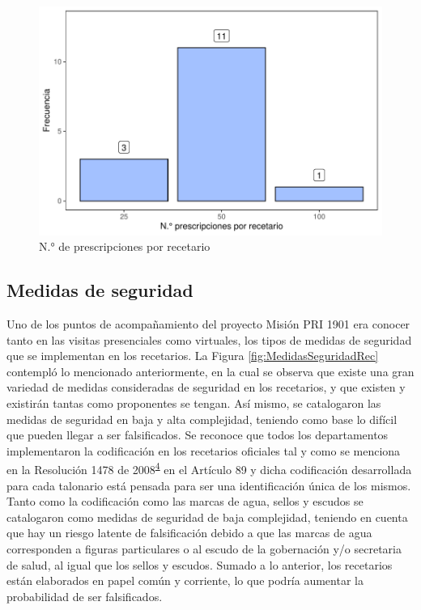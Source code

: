 \documentclass[
]{book}
\begin{document}
\begin{figure}

{\centering \includegraphics[width=0.85\linewidth]{InformeFinal_files/figure-latex/existenciaRecetarios4-1} 

}

\caption{N.° de prescripciones por recetario}\label{fig:existenciaRecetarios4}
\end{figure}

\hypertarget{medidas-de-seguridad}{%
\subsection{Medidas de seguridad}\label{medidas-de-seguridad}}

Uno de los puntos de acompañamiento del proyecto Misión PRI 1901 era conocer tanto en las visitas presenciales como virtuales, los tipos de medidas de seguridad que se implementan en los recetarios. La Figura \ref{fig:MedidasSeguridadRec} contempló lo mencionado anteriormente, en la cual se observa que existe una gran variedad de medidas consideradas de seguridad en los recetarios, y que existen y existirán tantas como proponentes se tengan. Así mismo, se catalogaron las medidas de seguridad en baja y alta complejidad, teniendo como base lo difícil que pueden llegar a ser falsificados. Se reconoce que todos los departamentos implementaron la codificación en los recetarios oficiales tal y como se menciona en la Resolución 1478 de 2008\textsuperscript{\protect\hyperlink{ref-MSPS1478-2006}{4}} en el Artículo 89 y dicha codificación desarrollada para cada talonario está pensada para ser una identificación única de los mismos.
Tanto como la codificación como las marcas de agua, sellos y escudos se catalogaron como medidas de seguridad de baja complejidad, teniendo en cuenta que hay un riesgo latente de falsificación debido a que las marcas de agua corresponden a figuras particulares o al escudo de la gobernación y/o secretaria de salud, al igual que los sellos y escudos. Sumado a lo anterior, los recetarios están elaborados en papel común y corriente, lo que podría aumentar la probabilidad de ser falsificados.
\end{document}
